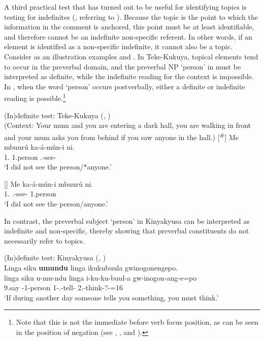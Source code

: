 \documentclass[output=paper]{langscibook}
\begin{document}
A third practical test that has turned out to be useful for identifying topics is testing for indefinites (\citealt[66]{Reinhart1981}, referring to \citealt{Firbas1966}). Because the topic is the point to which the information in the comment is anchored, this point must be at least identifiable, and therefore cannot be an indefinite non-specific referent. In other words, if an element is identified as a non-specific indefinite, it cannot also be a topic. Consider as an illustration examples  and . In Teke-Kukuya, topical elements tend to occur in the preverbal domain, and the preverbal NP ‘person’ in  must be interpreted as definite, while the indefinite reading for the context is impossible. In , when the word ‘person’ occurs postverbally, either a definite or indefinite reading is possible.\footnote{Note that this is not the immediate before verb focus position, as can be seen in the position of negation (see , \cite{chapters/teke}, and \citealt{LiFut}).}

\ea
\label{bkm:Ref134712964}
(In)definite test: Teke-Kukuya (, \cite{chapters/teke})\\
(Context: Your mum and you are entering a dark hall, you are walking in front and your mum asks you from behind if you saw anyone in the hall.)
\ea
[\textsuperscript{\#}]{
\label{bkm:Ref134712964:a}
\gll
Me  mbuurú  ka-á-mún-i  ni.\\
1\SG.\PRO{}  1.person  \SG.\PST{}-see-\PST{}  \NEG{}\\
\glt
‘I did not see the person/*anyone.’\\
}

\ex
[]{
\label{bkm:Ref134712964:b}
\gll
Me  ka-á-mún-i  mbuurú  ni.\\
1\SG.\PRO{}  \SG.\PST{}-see-\PST{}  1.person  \NEG{}\\
\glt
‘I did not see the person/anyone.’\\
}
\z
\z

In contrast, the preverbal subject ‘person’ in Kinyakyusa  can be interpreted as indefinite and non-specific, thereby showing that preverbal constituents do not necessarily refer to topics.

\ea
(In)definite test: Kinyakyusa (, \cite{chapters/kinyakyusa})\\
\label{bkm:Ref134712974}Linga siku \textbf{umundu} linga ikukubuula gwinogonengepo.\\
\gll
linga  siku  u-mu-ndu  linga  i-ku-ku-buul-a  gw-inogon-ang-e=po\\
\COND{}  9.say  \AUG{}-1-person  \COND{}  1\SM-\SG.\OM{}-tell-\FV{}  2\SG.\SM{}-think-?-\SBJV{}=16\\
\glt
‘If during another day someone tells you something, you must think.’\\
\end{document}
